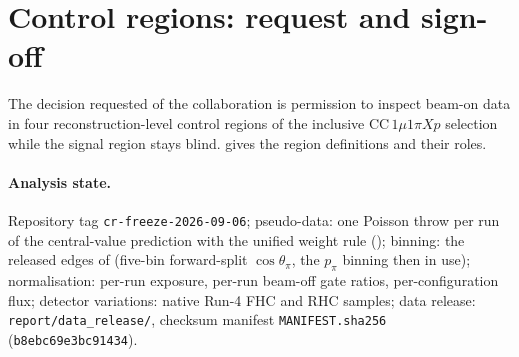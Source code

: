 

\section{Control regions: request and sign-off}
\label{sec:ar_cr}

The decision requested of the collaboration is permission to inspect beam-on data in four
reconstruction-level control regions of the inclusive $\mathrm{CC}\,1\mu1\pi Xp$ selection while the
signal region stays blind.  gives the region definitions and
 their roles.

\paragraph{Analysis state.} Repository tag \texttt{cr-freeze-2026-09-06};
pseudo-data: one Poisson throw per run of the central-value prediction with the unified
weight rule (); binning: the released edges of 
(five-bin forward-split $\cos\theta_\pi$, the $p_\pi$ binning then in use); normalisation: per-run
exposure, per-run beam-off gate ratios, per-configuration flux; detector variations:
native Run-4 FHC and RHC samples; data release: \texttt{report/data\_release/}, checksum
manifest \texttt{MANIFEST.sha256} (\texttt{b8ebc69e3bc91434}).

